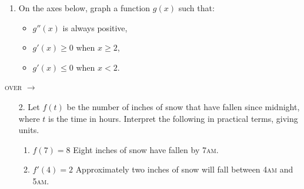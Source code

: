 \documentclass[11pt]{article}
\begin{document}
\pagestyle{empty}
\newsavebox{\quizfront}
\begin{lrbox}{\quizfront}
\begin{minipage}[top][4.5in][t]{\textwidth} \setlength{\parindent}{1.5em}
\drawtitle
\vspace{-0.5in}
\begin{enumerate}

\item On the axes below, graph a function $g(x)$ such that:
  \begin{itemize}
  \item $g''(x)$ is always positive,
  \item $g'(x) \geq 0$ when $x \geq 2$,
  \item $g'(x) \leq 0$ when $x < 2$.
  \end{itemize}
  
  \begin{center}
  \end{center}

\end{enumerate}

\hfill\textsc{over} $\longrightarrow$


\end{minipage}
\end{lrbox}

\newsavebox{\quizback}
\begin{lrbox}{\quizback}
\begin{minipage}[top][4.5in][t]{\textwidth} \setlength{\parindent}{1.5em}
\begin{enumerate}
\item[2.] Let $f(t)$ be the number of inches of snow that have fallen since
  midnight, where $t$ is the time in hours. Interpret the following in
  practical terms, giving units.
  \begin{enumerate}
  \item $f(7) = 8$
    \vfill
    {\color{blue}
      Eight inches of snow have fallen by 7\textsc{am}.
    }
    \vfill
  \item $f'(4) = 2$
    \vfill
    {\color{blue}
      Approximately two inches of snow will fall between 4\textsc{am}
      and 5\textsc{am}.
    }
    \vfill
  \end{enumerate}

\end{enumerate}
\end{minipage}
\end{lrbox}
\end{document}
